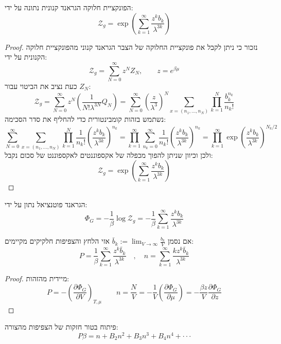 \documentclass{tstextbook}
\begin{document}
\begin{proposition}
הפונקציית חלוקה הגראנד קנונית נתונה על ידי:
$${\mathcal{Z}}_{g}=\exp\left(\sum_{k=1}^{\infty}{\frac{z^{k}b_{k}}{\lambda^{3k}}}\right)$$

\end{proposition}
\begin{proof}
נזכור כי ניתן לקבל את פונקציית החלוקה של הצבר הגראנד קנוני מהפונקציית חלוקה הקנונית על ידי:
$$\mathcal{Z}_{g}=\sum_{N=0}^{\infty}z^{N}Z_{N},\qquad z=e^{\beta\mu}$$
כעת נציב את הביטוי עבור \(Z_{N}\):
$${\mathcal{Z}}_{g}=\sum_{N=0}^{\infty}z^{N}\left({\frac{1}{N!\lambda^{3N}}}Q_{N}\right)=\sum_{N=0}^{\infty}\left({\frac{z}{\lambda^{3}}}\right)^{N}\sum_{x=(n_{1},\ldots,n_{N})}\prod_{k=1}^{N}{\frac{b_{k}^{n_{k}}}{n_{k}!}}$$
נשתמש בזהות קומבינטורית כדי להחליף את סדר הסכימה:
$$\sum_{N=0}^{\infty}\sum_{x=(n_{1},\ldots,n_{N})}\prod_{k=1}^{N}\frac{1}{n_{k}!}\left(\frac{z^{k}b_{k}}{\lambda^{3k}}\right)^{n_{k}}=\prod_{k=1}^{\infty}\sum_{n_{k}=0}^{\infty}\frac{1}{n_{k}!}\left(\frac{z^{k}b_{k}}{\lambda^{3k}}\right)^{n_{k}}=\prod_{k=1}^{\infty}\exp\left(\frac{z^{k}b_{k}}{\lambda^{3k}}\right)^{N_{k}/2}$$
ולכן וכיוון שניתן להפוך מכפלה של אקספוננטים לאקספוננט של סכום נקבל:
$${\mathcal{Z}}_{g}=\exp\left(\sum_{k=1}^{\infty}{\frac{z^{k}b_{k}}{\lambda^{3k}}}\right)$$

\end{proof}
\begin{corollary}
הגראנד פוטנציאל נתון על ידי:
$$\Phi_{G}=-\frac{1}{\beta}\log{\mathcal{Z}}_{g}=-\frac{1}{\beta}\sum_{k=1}^{\infty}\frac{z^{k}b_{k}}{\lambda^{3k}}$$

\end{corollary}
\begin{corollary}
אם נסמן \({\bar{b}}_{k}:=\operatorname*{lim}_{V\to\infty}{\frac{b_{k}}{V}}\) אזי הלחץ והצפיפות חלקיקים מקיימים:
$$P=\frac{1}{\beta}\sum_{k=1}^{\infty}\frac{z^{k}\bar{b}_{k}}{\lambda^{3k}}\quad,\quad n=\sum_{k=1}^{\infty}\frac{k z^{k}\bar{b}_{k}}{\lambda^{3k}}$$

\end{corollary}
\begin{proof}
מיידית מהזהות:
$$P=-\left({\frac{\partial \Phi_{G}}{\partial V}}\right)_{T,\mu}\qquad n={\frac{N}{V}}=-{\frac{1}{V}}\left({\frac{\partial \Phi_{G}}{\partial\mu}}\right)=-{\frac{\beta z}{V}}{\frac{\partial \Phi_{G}}{\partial z}}$$

\end{proof}
\begin{definition}
פיתוח בטור חזקות של הצפיפות מהצורה:
$$P\beta=n+B_{2}n^{2}+B_{3}n^{3}+B_{4}n^{4}+\cdot\cdot\cdot$$

\end{definition}
\end{document}
